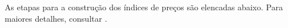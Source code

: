 \documentclass[twoside,a4paper,12pt]{report}
\begin{document}
% 
% 

As etapas para a construção dos índices de preços são elencadas abaixo. Para maiores detalhes, consultar \citet{ibgemetodos}.
\end{document}
